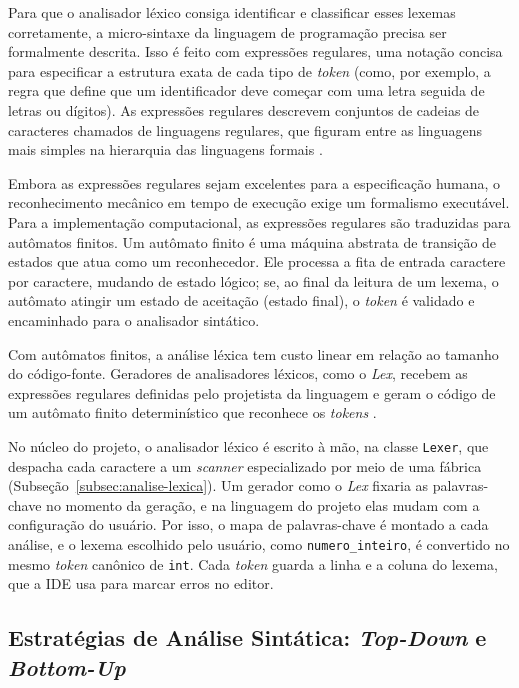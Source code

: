 Para que o analisador léxico consiga identificar e classificar esses lexemas corretamente, a micro-sintaxe da linguagem de programação precisa ser formalmente descrita. Isso é feito com expressões regulares, uma notação concisa para especificar a estrutura exata de cada tipo de \textit{token} (como, por exemplo, a regra que define que um identificador deve começar com uma letra seguida de letras ou dígitos). As expressões regulares descrevem conjuntos de cadeias de caracteres chamados de linguagens regulares, que figuram entre as linguagens mais simples na hierarquia das linguagens formais \cite{price2001}.

Embora as expressões regulares sejam excelentes para a especificação humana, o reconhecimento mecânico em tempo de execução exige um formalismo executável. Para a implementação computacional, as expressões regulares são traduzidas para autômatos finitos. Um autômato finito é uma máquina abstrata de transição de estados que atua como um reconhecedor. Ele processa a fita de entrada caractere por caractere, mudando de estado lógico; se, ao final da leitura de um lexema, o autômato atingir um estado de aceitação (estado final), o \textit{token} é validado e encaminhado para o analisador sintático.

Com autômatos finitos, a análise léxica tem custo linear em relação ao tamanho do código-fonte. Geradores de analisadores léxicos, como o \textit{Lex}, recebem as expressões regulares definidas pelo projetista da linguagem e geram o código de um autômato finito determinístico que reconhece os \textit{tokens} \cite{cooper2012}.

No núcleo do projeto, o analisador léxico é escrito à mão, na classe \texttt{Lexer}, que despacha cada caractere a um \textit{scanner} especializado por meio de uma fábrica (Subseção~\ref{subsec:analise-lexica}). Um gerador como o \textit{Lex} fixaria as palavras-chave no momento da geração, e na linguagem do projeto elas mudam com a configuração do usuário. Por isso, o mapa de palavras-chave é montado a cada análise, e o lexema escolhido pelo usuário, como \texttt{numero\_inteiro}, é convertido no mesmo \textit{token} canônico de \texttt{int}. Cada \textit{token} guarda a linha e a coluna do lexema, que a IDE usa para marcar erros no editor.


\subsection{Estratégias de Análise Sintática: \textit{Top-Down} e \textit{Bottom-Up}}

